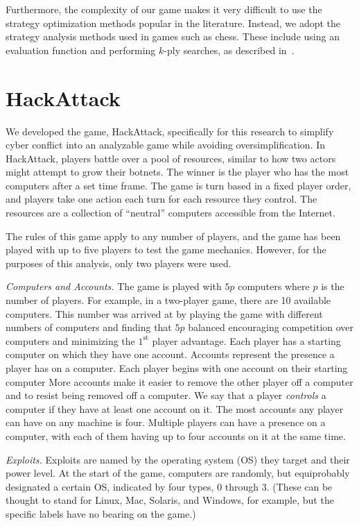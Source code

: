 \documentclass{sig-alternate}
\begin{document}
Furthermore, the complexity of our game makes it very difficult to use
the strategy optimization methods popular in the literature. Instead,
we adopt the strategy analysis methods used in games such as
chess. These include using an evaluation function and performing
$k$-ply searches, as described in~\cite{levy2009computer,shannon1950programming}.


\section{HackAttack}
\label{sec:hackattack}
We developed the game, HackAttack, specifically for this research to simplify cyber conflict into an analyzable game while avoiding oversimplification. 
In HackAttack, players battle over a pool of resources, similar to how two actors might attempt to grow their botnets. 
The winner is the player who has the most computers after a set time frame. 
The game is turn based in a fixed player order, and players take one action each turn for each resource they control. The resources are a collection of ``neutral'' computers accessible from the Internet. 

The rules of this game apply to any number of players, and the game has been played with up to five players to test the game mechanics. However, for the purposes of this analysis, only two players were used. 

{\em Computers and Accounts.}
The game is played with $5p$ computers where $p$ is the number of players.
For example, in a two-player game, there are 10 available computers.
This number was arrived at by playing the game with different numbers of computers and finding that $5p$ balanced encouraging competition over computers and minimizing the $1^{\mbox{st}}$ player advantage.
Each player has a starting computer on which they have one account.
Accounts represent the presence a player has on a computer. Each player begins with one account on their starting computer
More accounts make it easier to remove the other player off a computer and to resist being removed off a computer.
We say that a player {\em controls} a computer if they have at least one account on it.
The most accounts any player can have on any machine is four. 
Multiple players can have a presence on a computer, with each of them having up to four accounts on it at the same time. 

{\em Exploits.}
Exploits are named by the operating system (OS) they target and their power level.
At the start of the game, computers are randomly, but equiprobably designated a certain OS, indicated by four types, 0 through 3. 
(These can be thought to stand for Linux, Mac, Solaris, and Windows, for example, but the specific labels have no bearing on the game.) 
\end{document}
